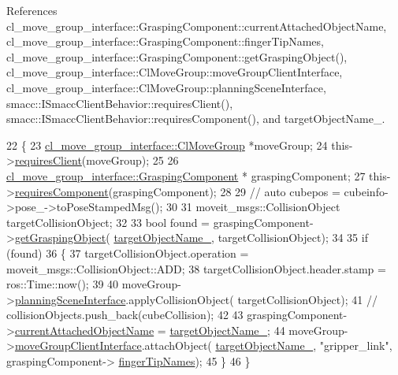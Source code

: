 References cl\+\_\+move\+\_\+group\+\_\+interface\+::\+Grasping\+Component\+::current\+Attached\+Object\+Name, cl\+\_\+move\+\_\+group\+\_\+interface\+::\+Grasping\+Component\+::finger\+Tip\+Names, cl\+\_\+move\+\_\+group\+\_\+interface\+::\+Grasping\+Component\+::get\+Grasping\+Object(), cl\+\_\+move\+\_\+group\+\_\+interface\+::\+Cl\+Move\+Group\+::move\+Group\+Client\+Interface, cl\+\_\+move\+\_\+group\+\_\+interface\+::\+Cl\+Move\+Group\+::planning\+Scene\+Interface, smacc\+::\+I\+Smacc\+Client\+Behavior\+::requires\+Client(), smacc\+::\+I\+Smacc\+Client\+Behavior\+::requires\+Component(), and target\+Object\+Name\+\_\+.


\begin{DoxyCode}
22     \{
23         \hyperlink{classcl__move__group__interface_1_1ClMoveGroup}{cl\_move\_group\_interface::ClMoveGroup} *moveGroup;
24         this->\hyperlink{classsmacc_1_1ISmaccClientBehavior_a32b16e99e3b4cb289414203dc861a440}{requiresClient}(moveGroup);
25 
26         \hyperlink{classcl__move__group__interface_1_1GraspingComponent}{cl\_move\_group\_interface::GraspingComponent} *
      graspingComponent;
27         this->\hyperlink{classsmacc_1_1ISmaccClientBehavior_a19c6d658c8e809bb93bfdc9b639a3ac3}{requiresComponent}(graspingComponent);
28 
29         \textcolor{comment}{// auto cubepos = cubeinfo->pose\_->toPoseStampedMsg();}
30 
31         moveit\_msgs::CollisionObject targetCollisionObject;
32 
33         \textcolor{keywordtype}{bool} found = graspingComponent->\hyperlink{classcl__move__group__interface_1_1GraspingComponent_a283b379a7b7ad91c69ee94a057730165}{getGraspingObject}(
      \hyperlink{classcl__move__group__interface_1_1CbAttachObject_a58dcc567e6316e57eb36e6d5a38f7287}{targetObjectName\_}, targetCollisionObject);
34 
35         \textcolor{keywordflow}{if} (found)
36         \{
37             targetCollisionObject.operation = moveit\_msgs::CollisionObject::ADD;
38             targetCollisionObject.header.stamp = ros::Time::now();
39 
40             moveGroup->\hyperlink{classcl__move__group__interface_1_1ClMoveGroup_a11bfab580f36e2ad32c9b37d6f58f44c}{planningSceneInterface}.applyCollisionObject(
      targetCollisionObject);
41             \textcolor{comment}{// collisionObjects.push\_back(cubeCollision);}
42 
43             graspingComponent->\hyperlink{classcl__move__group__interface_1_1GraspingComponent_a486b5c831dc81ae0bf909b585ba7c615}{currentAttachedObjectName} = 
      \hyperlink{classcl__move__group__interface_1_1CbAttachObject_a58dcc567e6316e57eb36e6d5a38f7287}{targetObjectName\_};
44             moveGroup->\hyperlink{classcl__move__group__interface_1_1ClMoveGroup_a92922ea689e4e1b7b91512c56629c95b}{moveGroupClientInterface}.attachObject(
      \hyperlink{classcl__move__group__interface_1_1CbAttachObject_a58dcc567e6316e57eb36e6d5a38f7287}{targetObjectName\_}, \textcolor{stringliteral}{"gripper\_link"}, graspingComponent->
      \hyperlink{classcl__move__group__interface_1_1GraspingComponent_afc08a0abc3220a377d0bbf798383a42a}{fingerTipNames});
45         \}
46     \}
\end{DoxyCode}
